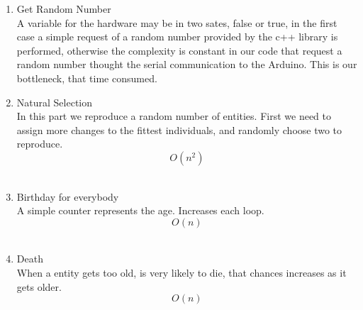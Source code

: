 \documentclass[twocolumn]{IEEEtran}
\begin{document}
\begin{enumerate}
	\item Get Random Number\\
    A variable for the hardware may be in two sates, false or true, in the first case a simple request of a random number provided by the c++ library is performed, otherwise the complexity is constant in our code that request a random number thought the serial communication to the Arduino. This is our bottleneck, that time consumed.\\
	\item Natural Selection\\
    	In this part we reproduce a random number of entities. First we need to assign more changes to the fittest individuals, and randomly choose two to reproduce.
        \begin{equation} O(n^2) \end{equation}\\
    \item Birthday for everybody\\
    A simple counter represents the age. Increases each loop.
    \begin{equation} O(n) \end{equation}\\
    
    \item Death\\
    When a entity gets too old, is very likely to die, that chances increases as it gets older.
    \begin{equation} O(n) \end{equation}\\ 
    
\end{enumerate}	
\end{document}
